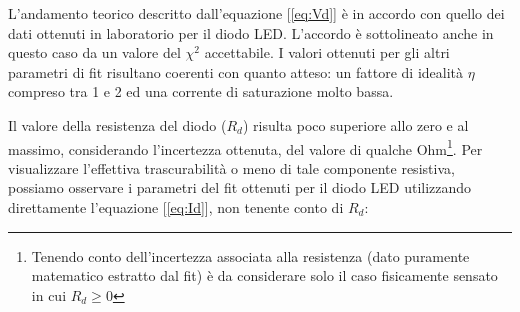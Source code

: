 \documentclass[9pt,a4paper,twocolumn,twoside]{tau-class/tau}
\begin{document}
L'andamento teorico descritto dall'equazione [\ref{eq:Vd}] è in accordo con quello dei dati ottenuti in laboratorio per il diodo LED. L'accordo è sottolineato anche in questo caso da un valore del $\chi^2$ accettabile.
I valori ottenuti per gli altri parametri di fit risultano coerenti con quanto atteso: un fattore di idealità $\eta$ compreso tra 1 e 2 ed una corrente di saturazione molto bassa.

Il valore della resistenza del diodo ($R_d$) risulta poco superiore allo zero e al massimo, considerando l'incertezza ottenuta, del valore di qualche Ohm\footnote{Tenendo conto dell'incertezza associata alla resistenza (dato puramente matematico estratto dal fit) è da considerare solo il caso fisicamente sensato in cui $R_d \geq 0$}.
Per visualizzare l'effettiva trascurabilità o meno di tale componente resistiva, possiamo osservare i parametri del fit ottenuti per il diodo LED utilizzando direttamente l'equazione [\ref{eq:Id}], non tenente conto di $R_d$:
\end{document}
